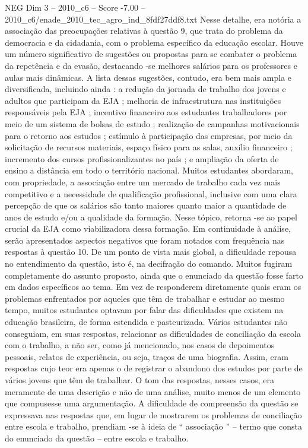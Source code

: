 \begin{textsample}{NEG Dim 3 – 2010\_c6 – Score -7.00 – 2010\_c6/enade\_2010\_tec\_agro\_ind\_8fdf27ddf8.txt}
Nesse detalhe, era notória a associação das preocupações relativas à questão 9, que trata do problema da democracia e da cidadania, com o problema específico da educação escolar.
Houve um número significativo de sugestões ou propostas para se combater o problema da repetência e da evasão, destacando -se melhores salários para os professores e aulas mais dinâmicas.
A lista dessas sugestões, contudo, era bem mais ampla e diversificada, incluindo ainda : a redução da jornada de trabalho dos jovens e adultos que participam da EJA ; melhoria de infraestrutura nas instituições responsáveis pela EJA ; incentivo financeiro aos estudantes trabalhadores por meio de um sistema de bolsas de estudo ; realização de campanhas motivacionais para o retorno aos estudos ; estímulo à participação das empresas, por meio da solicitação de recursos materiais, espaço físico para as salas, auxílio financeiro ; incremento dos cursos profissionalizantes no país ; e ampliação da oferta de ensino a distância em todo o território nacional.
Muitos estudantes abordaram, com propriedade, a associação entre um mercado de trabalho cada vez mais competitivo e a necessidade de qualificação profissional, inclusive com uma clara percepção de que os salários são tanto maiores quanto maior a quantidade de anos de estudo e/ou a qualidade da formação.
Nesse tópico, retorna -se ao papel crucial da EJA como viabilizadora dessa formação.
Em continuidade à análise, serão apresentados aspectos negativos que foram notados com frequência nas respostas à questão 10.
De um ponto de vista mais global, a dificuldade repousa no entendimento da questão, isto é, na decifração do comando.
Muitos fugiram completamente do assunto proposto, ainda que o enunciado da questão fosse farto em dados específicos ao tema.
Em vez de responderem diretamente quais eram os problemas enfrentados por aqueles que têm de trabalhar e estudar ao mesmo tempo, muitos estudantes optavam por falar das dificuldades que existem na educação brasileira, de forma estendida e pasteurizada.
Vários estudantes não conseguiam, em suas respostas, relacionar as dificuldades de conciliação da escola com o trabalho, a não ser, como já mencionado, nos casos de depoimentos pessoais, relatos de experiência, ou seja, traços de uma biografia.
Assim, eram respostas cujo teor era apenas o de registrar o abandono dos estudos por parte de vários jovens que têm de trabalhar.
O tom das respostas, nesses casos, era meramente de uma descrição e não de uma análise, muito menos de um elemento que compusesse uma argumentação.
A dificuldade de compreensão da questão se expressava nas respostas que, em lugar de mostrarem os problemas de conciliação entre escola e trabalho, prendiam -se à ideia de “ associação ” – termo que consta do enunciado da questão – entre escola e trabalho.

\end{textsample}
